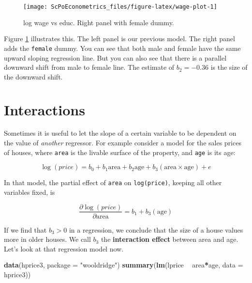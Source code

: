 \documentclass[]{book}
\newenvironment{Shaded}{\begin{snugshade}}{\end{snugshade}}
\newcommand{\DataTypeTok}[1]{\textcolor[rgb]{0.13,0.29,0.53}{#1}}
\newcommand{\KeywordTok}[1]{\textcolor[rgb]{0.13,0.29,0.53}{\textbf{#1}}}
\newcommand{\NormalTok}[1]{#1}
\newcommand{\OperatorTok}[1]{\textcolor[rgb]{0.81,0.36,0.00}{\textbf{#1}}}
\newcommand{\StringTok}[1]{\textcolor[rgb]{0.31,0.60,0.02}{#1}}
\begin{document}
\begin{figure}

{\centering \texttt{[image: ScPoEconometrics\_files/figure-latex/wage-plot-1]} 

}

\caption{log wage vs educ. Right panel with female dummy.}\label{fig:wage-plot}
\end{figure}

Figure \ref{fig:wage-plot} illustrates this. The left panel is our previous model. The right panel adds the \texttt{female} dummy. You can see that both male and female have the same upward sloping regression line. But you can also see that there is a parallel downward shift from male to female line. The estimate of \(b_2 = -0.36\) is the size of the downward shift.

\hypertarget{interactions}{%
\section{Interactions}\label{interactions}}

Sometimes it is useful to let the slope of a certain variable to be dependent on the value of \emph{another} regressor. For example consider a model for the sales prices of houses, where \texttt{area} is the livable surface of the property, and \texttt{age} is its age:

\begin{equation}
\log(price) = b_0 + b_1 \text{area} + b_2 \text{age} + b_3 (\text{area} \times \text{age}) + e  \label{eq:price-interact}
\end{equation}

In that model, the partial effect of \texttt{area} on \texttt{log(price)}, keeping all other variables fixed, is

\begin{equation}
\frac{\partial \log(price)}{\partial \text{area}} = b_1 + b_3 (\text{age}) 
\end{equation}

If we find that \(b_3 > 0\) in a regression, we conclude that the size of a house values more in older houses. We call \(b_3\) the \textbf{interaction effect} between area and age. Let's look at that regression model now.

\begin{Shaded}
\begin{Highlighting}[]
\KeywordTok{data}\NormalTok{(hprice3, }\DataTypeTok{package =} \StringTok{"wooldridge"}\NormalTok{)}
\KeywordTok{summary}\NormalTok{(}\KeywordTok{lm}\NormalTok{(lprice }\OperatorTok{~}\StringTok{ }\NormalTok{area}\OperatorTok{*}\NormalTok{age, }\DataTypeTok{data =}\NormalTok{ hprice3))}
\end{Highlighting}
\end{Shaded}
\end{document}
